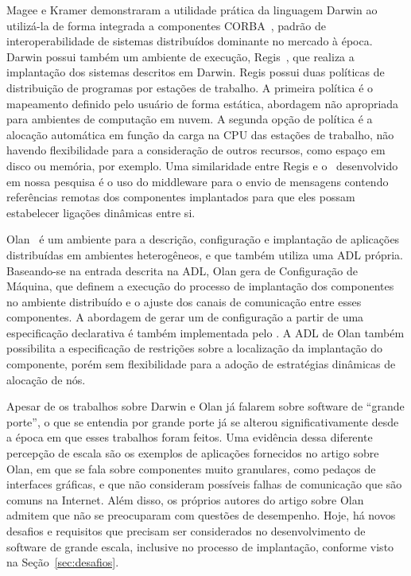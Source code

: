 Magee e Kramer demonstraram a utilidade prática da linguagem Darwin ao utilizá-la de forma integrada a componentes CORBA~\cite{Magee1997Corba}, padrão de interoperabilidade de sistemas distribuídos dominante no mercado à época. Darwin possui também um ambiente de execução, Regis~\cite{Magee1994Regis}, que realiza a implantação dos sistemas descritos em Darwin. Regis possui duas políticas de distribuição de programas por estações de trabalho. A primeira política é o mapeamento definido pelo usuário de forma estática, abordagem não apropriada para ambientes de computação em nuvem. A segunda opção de política é a alocação automática em função da carga na CPU das estações de trabalho, não havendo flexibilidade para a consideração de outros recursos, como espaço em disco ou memória, por exemplo. Uma similaridade entre Regis e o \ee\ desenvolvido em nossa pesquisa é o uso do middleware para o envio de mensagens contendo referências remotas dos componentes implantados para que eles possam estabelecer ligações dinâmicas entre si.

Olan~\cite{Balter1998Olan} é um ambiente para a descrição, configuração e implantação de aplicações distribuídas em ambientes heterogêneos, e que também utiliza uma ADL própria. Baseando-se na entrada descrita na ADL, Olan gera \scripts de Configuração de Máquina, que definem a execução do processo de implantação dos componentes no ambiente distribuído e o ajuste dos canais de comunicação entre esses componentes. A abordagem de gerar um \script de configuração a partir de uma especificação declarativa é também implementada pelo \ee. A ADL de Olan também possibilita a especificação de restrições sobre a localização da implantação do componente, porém sem flexibilidade para a adoção de estratégias dinâmicas de alocação de nós.

Apesar de os trabalhos sobre Darwin e Olan já falarem sobre software de ``grande porte'', o que se entendia por grande porte já se alterou significativamente desde a época em que esses trabalhos foram feitos. Uma evidência dessa diferente percepção de escala são os exemplos de aplicações fornecidos no artigo sobre Olan, em que se fala sobre componentes muito granulares, como pedaços de interfaces gráficas, e que não consideram possíveis falhas de comunicação que são comuns na Internet. Além disso, os próprios autores do artigo sobre Olan admitem que não se preocuparam com questões de desempenho. 
Hoje, há novos  desafios e requisitos que precisam ser considerados no desenvolvimento de software 
de grande escala, inclusive no processo de implantação, conforme visto na Seção~\ref{sec:desafios}.

